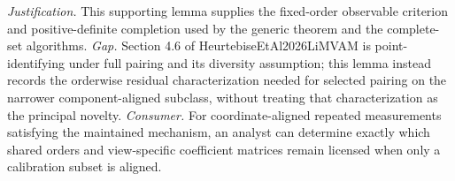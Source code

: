 \documentclass{article}
\begin{document}
\par\smallskip\noindent \textit{Justification.} This supporting lemma supplies the fixed-order observable criterion and positive-definite completion used by the generic theorem and the complete-set algorithms. \textit{Gap.} Section 4.6 of HeurtebiseEtAl2026LiMVAM is point-identifying under full pairing and its diversity assumption; this lemma instead records the orderwise residual characterization needed for selected pairing on the narrower component-aligned subclass, without treating that characterization as the principal novelty. \textit{Consumer.} For coordinate-aligned repeated measurements satisfying the maintained mechanism, an analyst can determine exactly which shared orders and view-specific coefficient matrices remain licensed when only a calibration subset is aligned.
\end{document}
